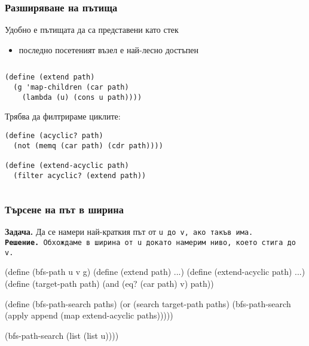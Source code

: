 \documentclass{beamer}
\begin{document}
\begin{frame}[fragile]
  \frametitle{Разширяване на пътища}
  Удобно е пътищата да са представени като \alert{стек}
  \begin{itemize}
  \item последно посетеният възел е най-лесно достъпен
  \end{itemize}
  \pause
  \begin{columns}[T]
    \begin{column}{0.65\textwidth}
      \pause
\begin{verbatim}
(define (extend path)
  (g 'map-children (car path)
    (lambda (u) (cons u path))))
\end{verbatim}
      \pause
      Трябва да филтрираме циклите:
      \pause
\begin{verbatim}
(define (acyclic? path)
  (not (memq (car path) (cdr path))))

(define (extend-acyclic path)
  (filter acyclic? (extend path))
\end{verbatim}
    \end{column}
    \begin{column}{0.35\textwidth}
      \samplegraph
    \end{column}
  \end{columns}
\end{frame}

\begin{frame}[fragile]
  \frametitle{Търсене на път в ширина}
  \textbf{Задача.} Да се намери \alert{най-краткия} път от \tt u до \tt v, ако такъв има.\\
  \pause
  \textbf{Решение.} Обхождаме в ширина от \tt u докато намерим ниво, което стига до \tt v.
  \pause
\begin{semiverbatim}
(define (bfs-path u v g)
  \textcolor{black!20}{(define (extend path) ...)
  (define (extend-acyclic path) ...)}
  (define (target-path path)
    (and (eq? (car path) v) path))

  (define (bfs-path-search paths)
    (or (search target-path paths)
        (bfs-path-search (apply append
                           (map extend-acyclic paths)))))

  (bfs-path-search (list (list u))))
\end{semiverbatim}
\end{frame}
\end{document}
